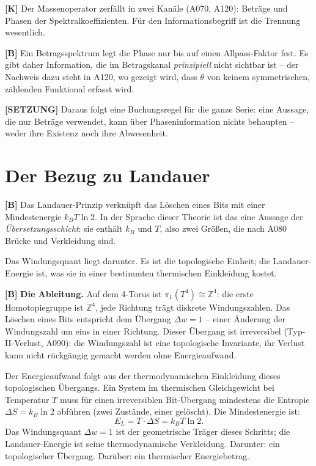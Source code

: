 \textbf{[K]} Der Massenoperator zerfällt in zwei Kanäle (A070, A120): Beträge
und Phasen der Spektralkoeffizienten. Für den Informationsbegriff ist die
Trennung wesentlich.

\textbf{[B]} Ein Betragsspektrum legt die Phase nur bis auf einen
Allpass-Faktor fest. Es gibt daher Information, die im Betragskanal
\emph{prinzipiell} nicht sichtbar ist -- der Nachweis dazu steht in A120, wo
gezeigt wird, dass $\theta$ von keinem symmetrischen, zählenden Funktional
erfasst wird.

\textbf{[SETZUNG]} Daraus folgt eine Buchungsregel für die ganze Serie: eine
Aussage, die nur Beträge verwendet, kann über Phaseninformation nichts
behaupten -- weder ihre Existenz noch ihre Abwesenheit.

\section{Der Bezug zu Landauer}

\textbf{[B]} Das Landauer-Prinzip verknüpft das Löschen eines Bits mit einer
Mindestenergie $k_B T\ln 2$. In der Sprache dieser Theorie ist das eine
Aussage der \emph{Übersetzungsschicht}: sie enthält $k_B$ und $T$, also
zwei Größen, die nach A080 Brücke und Verkleidung sind.

Das Windungsquant liegt darunter. Es ist die topologische Einheit; die
Landauer-Energie ist, was sie in einer bestimmten thermischen Einkleidung
kostet.

\textbf{[B]} \textbf{Die Ableitung.} Auf dem 4-Torus ist
$\pi_1(T^4)\cong\mathbb Z^4$: die erste Homotopiegruppe ist
$\mathbb Z^4$, jede Richtung trägt diskrete Windungszahlen. Das Löschen eines
Bits entspricht dem Übergang $\Delta w = 1$ -- einer Änderung der Windungszahl
um eins in einer Richtung. Dieser Übergang ist irreversibel (Typ-II-Verlust,
A090): die Windungszahl ist eine topologische Invariante, ihr Verlust kann nicht
rückgängig gemacht werden ohne Energieaufwand.

Der Energieaufwand folgt aus der thermodynamischen Einkleidung dieses
topologischen Übergangs. Ein System im thermischen Gleichgewicht bei Temperatur
$T$ muss für einen irreversiblen Bit-Übergang mindestens die Entropie
$\Delta S = k_B \ln 2$ abführen (zwei Zustände, einer gelöscht). Die
Mindestenergie ist:
\[
  E_L = T\cdot\Delta S = k_B T\ln 2.
\]
Das Windungsquant $\Delta w=1$ ist der geometrische Träger dieses Schritts; die
Landauer-Energie ist seine thermodynamische Verkleidung. Darunter: ein
topologischer Übergang. Darüber: ein thermischer Energiebetrag.

